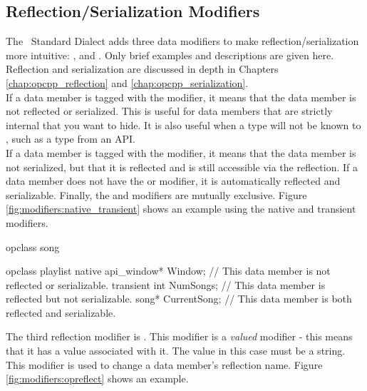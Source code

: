 \subsection{Reflection/Serialization Modifiers}
\label{subsec:modifiers:reflection_serialization_modifiers}

The \opCPP\ Standard Dialect adds three data modifiers to make reflection/serialization more intuitive: ,  and .  Only brief examples and descriptions are given here.  Reflection and serialization are discussed in depth in Chapters \ref{chap:opcpp_reflection} and \ref{chap:opcpp_serialization}. \\

If a data member is tagged with the  modifier, it means that the data member is not reflected or serialized.  This is useful for data members that are strictly internal that you want to hide.  It is also useful when a type will not be known to \opCPP, such as a type from an API. \\

If a data member is tagged with the  modifier, it means that the data member is not serialized, but that it is reflected and is still accessible via the reflection.  If a data member does not have the  or  modifier, it is automatically reflected and serializable.  Finally, the  and  modifiers are mutually exclusive.  Figure \ref{fig:modifiers:native_transient} shows an example using the native and transient modifiers. \\

\begin{opcpp}[label={fig:modifiers:native_transient},caption={Using the \opcppk{native} and \opcppk{transient} data modifiers.}]
opclass song
{

}

opclass playlist
{
    native api_window* Window;      // This data member is not reflected or serializable.
    transient int      NumSongs;    // This data member is reflected but not serializable.
    song*              CurrentSong; // This data member is both reflected and serializable.
}
\end{opcpp}

The third reflection modifier is .  This modifier is a \textit{valued} modifier - this means that it has a value associated with it.  The value in this case must be a string.  This modifier is used to change a data member's reflection name.  Figure \ref{fig:modifiers:opreflect} shows an example.

